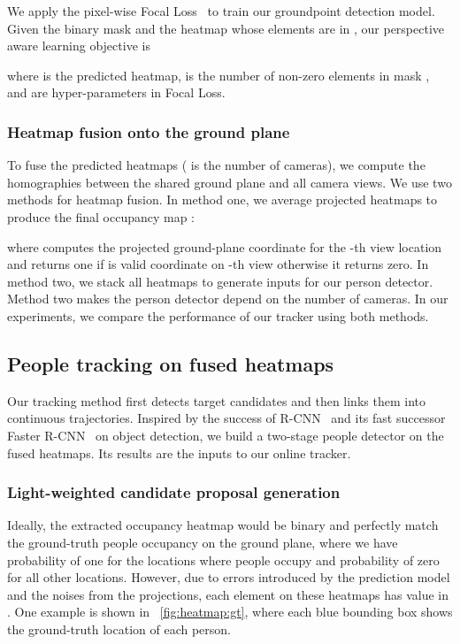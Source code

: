 \documentclass{article}
\begin{document}
We apply the pixel-wise Focal Loss~\cite{law2018cornernet} to train our groundpoint
detection model. Given the  binary mask  and the heatmap  whose elements are in , our perspective aware learning objective is

where  is the predicted heatmap,  is  the number of non-zero elements in mask ,  and  are hyper-parameters in Focal Loss.

\subsubsection{Heatmap fusion onto the ground plane}
To fuse the predicted heatmaps  ( is the number of cameras), we compute the homographies  between the shared ground plane and all camera views. We use two methods for heatmap fusion. 
In method one, we average projected heatmaps to produce the final occupancy map :


where  computes the projected ground-plane coordinate for the -th view location   and  returns one if  is valid coordinate on
-th view otherwise it returns zero.
In method two, we stack all heatmaps to generate inputs for our person detector. Method two makes the person detector depend on the number of cameras.
In our experiments, we compare the performance of our tracker using both methods.


\subsection{People tracking on fused heatmaps}
\label{sec:tracking}
Our tracking method first detects target candidates and then links them into continuous trajectories.
Inspired by the success of R-CNN~\cite{Girshick_2014_CVPR} and its fast successor Faster R-CNN~\cite{ren2015faster} on object detection,
we build a two-stage people detector on the fused heatmaps. Its results are the inputs to our online tracker.
\subsubsection{Light-weighted candidate proposal generation}
Ideally, the extracted occupancy heatmap would be binary and perfectly match
the ground-truth people occupancy on the ground plane, where we have probability of one for the locations where people occupy and probability of zero for all other locations. However, due to errors introduced by the prediction model and the noises
from the projections, each element on these heatmaps has value in . One example is shown in \figurename~{\ref{fig:heatmap:gt}}, where each blue bounding box shows the ground-truth location of each person.
\end{document}
